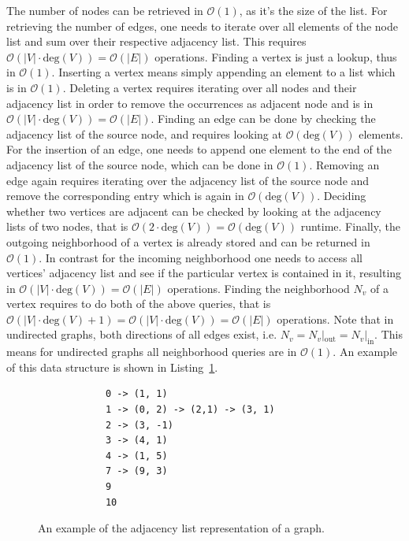         The number of nodes can be retrieved in $\mathcal{O}(1)$, as it's the size of the list.
        For retrieving the number of edges, one needs to iterate over all elements of the node list and sum over their respective adjacency list. 
        This requires $\mathcal{O}(|V| \cdot \text{deg}(V)) = \mathcal{O}(|E|)$ operations.
        Finding a vertex is just a lookup, thus in $\mathcal{O}(1)$.
        Inserting a vertex means simply appending an element to a list which is in $\mathcal{O}(1)$.
        Deleting a vertex requires iterating over all nodes and their adjacency list in order to remove the occurrences as adjacent node and is in $\mathcal{O}(|V| \cdot \text{deg}(V)) = \mathcal{O}(|E|)$.
        Finding an edge can be done by checking the adjacency list of the source node, and requires looking at $\mathcal{O}(\text{deg}(V))$ elements.
        For the insertion of an edge, one needs to append one element to the end of the adjacency list of the source node, which can be done in $\mathcal{O}(1)$.
        Removing an edge again requires iterating over the adjacency list of the source node and remove the corresponding entry which is again in $\mathcal{O}(\text{deg}(V))$.        
        Deciding whether two vertices are adjacent can be checked by looking at the adjacency lists of two nodes, that is $\mathcal{O}(2 \cdot \text{deg}(V)) = \mathcal{O}(\text{deg}(V))$ runtime.        
        Finally, the outgoing neighborhood of a vertex is already stored and can be returned in $\mathcal{O}(1)$.
        In contrast for the incoming neighborhood one needs to access all vertices' adjacency list and see if the particular vertex is contained in it, resulting in $\mathcal{O}(|V| \cdot \text{deg}(V)) = \mathcal{O}(|E|)$ operations.
        Finding the neighborhood $N_v$ of a vertex requires to do both of the above queries, that is $\mathcal{O}(|V| \cdot \text{deg}(V) + 1) = \mathcal{O}(|V| \cdot \text{deg}(V))  = \mathcal{O}(|E|)$ operations.  
        Note that in undirected graphs, both directions of all edges exist, i.e. $N_v = N_v |_\text{out} = N_v |_\text{in}$. This means for undirected graphs all neighborhood queries are in $\mathcal{O}(1)$.      
        An example of this data structure is shown in Listing~\ref{adjl}.
        
        \begin{figure}[htp]
         \begin{center}
          \begin{verbatim}
            0 -> (1, 1)
            1 -> (0, 2) -> (2,1) -> (3, 1)
            2 -> (3, -1)
            3 -> (4, 1)
            4 -> (1, 5)
            7 -> (9, 3)
            9
            10
          \end{verbatim}
         \end{center}
         \caption{An example of the adjacency list representation of a graph.}
         \label{adjl}
        \end{figure}
        
